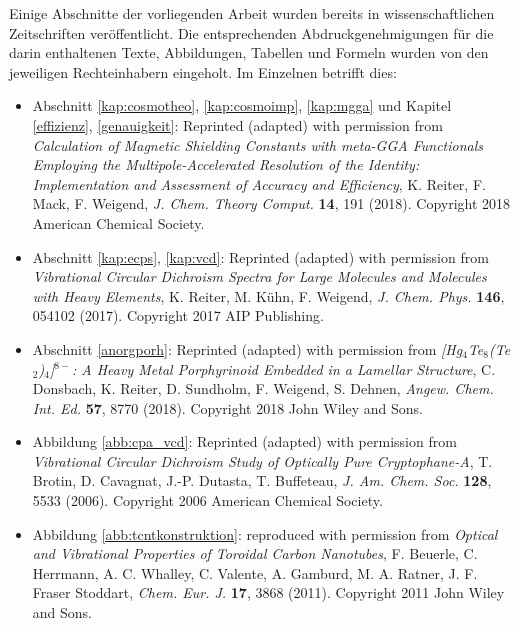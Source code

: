 Einige Abschnitte der vorliegenden Arbeit wurden bereits in wissenschaftlichen Zeitschriften veröffentlicht. Die entsprechenden Abdruckgenehmigungen für die darin enthaltenen Texte, Abbildungen, Tabellen und Formeln wurden von den jeweiligen Rechteinhabern eingeholt. Im Einzelnen betrifft dies:

\begin{itemize}
\item{Abschnitt \ref{kap:cosmotheo}, \ref{kap:cosmoimp}, \ref{kap:mgga} und Kapitel \ref{effizienz}, \ref{genauigkeit}: Reprinted (adapted) with permission from \textit{Calculation of Magnetic Shielding Constants with meta-GGA Functionals Employing the Multipole-Accelerated Resolution of the Identity: Implementation and Assessment of Accuracy and Efficiency}, K. Reiter, F. Mack, F. Weigend, \textit{J. Chem. Theory Comput.} \textbf{14}, 191 (2018). Copyright 2018 American Chemical Society.}
\item{Abschnitt \ref{kap:ecps}, \ref{kap:vcd}: Reprinted (adapted) with permission from \textit{Vibrational Circular Dichroism Spectra for Large Molecules and Molecules with Heavy Elements}, K. Reiter, M. Kühn, F. Weigend, \textit{J. Chem. Phys.} \textbf{146}, 054102 (2017). Copyright 2017 AIP Publishing.}
\item{Abschnitt \ref{anorgporh}: Reprinted (adapted) with permission from \textit{[Hg$_4$Te$_8$(Te$_2$)$_4$]$^{8-}$: A Heavy Metal Porphyrinoid Embedded in a Lamellar Structure}, C. Donsbach, K. Reiter, D. Sundholm, F. Weigend, S. Dehnen, \textit{Angew. Chem. Int. Ed.} \textbf{57}, 8770 (2018). Copyright 2018 John Wiley and Sons.}
\item{Abbildung \ref{abb:cpa_vcd}: Reprinted (adapted) with permission from \textit{Vibrational Circular Dichroism Study of Optically Pure Cryptophane-A}, T. Brotin, D. Cavagnat, J.-P. Dutasta, T. Buffeteau, \textit{J. Am. Chem. Soc.} \textbf{128}, 5533 (2006). Copyright 2006 American Chemical Society.}
\item{Abbildung \ref{abb:tcntkonstruktion}: reproduced with permission from \textit{Optical and Vibrational Properties of Toroidal Carbon Nanotubes}, F. Beuerle, C. Herrmann, A. C. Whalley, C. Valente, A. Gamburd, M. A. Ratner, J. F. Fraser Stoddart, \textit{Chem. Eur. J.} \textbf{17}, 3868 (2011). Copyright 2011 John Wiley and Sons.}
\end{itemize}